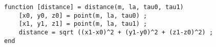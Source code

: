 \begin{verbatim}
function [distance] = distance(m, la, tau0, tau1)
    [x0, y0, z0] = point(m, la, tau0) ;
    [x1, y1, z1] = point(m, la, tau1) ;
    distance = sqrt ((x1-x0)^2 + (y1-y0)^2 + (z1-z0)^2) ;
end
\end{verbatim}
